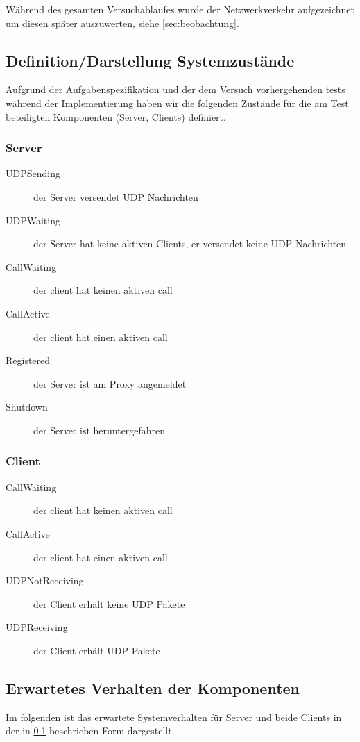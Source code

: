\documentclass[10pt]{scrartcl}
\begin{document}
Während des gesamten Versuchablaufes wurde der Netzwerkverkehr aufgezeichnet um diesen später auszuwerten, siehe \ref{sec:beobachtung}.

\subsection{Definition/Darstellung Systemzustände}\label{subsec:systemzusatende}
Aufgrund der Aufgabenspezifikation und der dem Versuch vorhergehenden tests während der Implementierung haben wir die folgenden Zustände für die am Test beteiligten Komponenten (Server, Clients) definiert.


\subsubsection{Server}
	\begin{description}
		\item[UDPSending] der Server versendet UDP Nachrichten
		\item[UDPWaiting] der Server hat keine aktiven Clients, er versendet keine UDP Nachrichten
		\item[CallWaiting] der client hat keinen aktiven call
		\item[CallActive] der client hat einen aktiven call
		\item[Registered] der Server ist am Proxy angemeldet
		\item[Shutdown] der Server ist heruntergefahren
	\end{description}
	
\subsubsection{Client}	
\begin{description}
		\item[CallWaiting] der client hat keinen aktiven call
		\item[CallActive] der client hat einen aktiven call
		\item[UDPNotReceiving] der Client erhält keine UDP Pakete
		\item[UDPReceiving] der Client erhält UDP Pakete
	\end{description}	
	
\subsection{Erwartetes Verhalten der Komponenten}
Im folgenden ist das erwartete Systemverhalten für Server und beide Clients in der in \ref{subsec:systemzusatende} beschrieben Form dargestellt.
\end{document}
